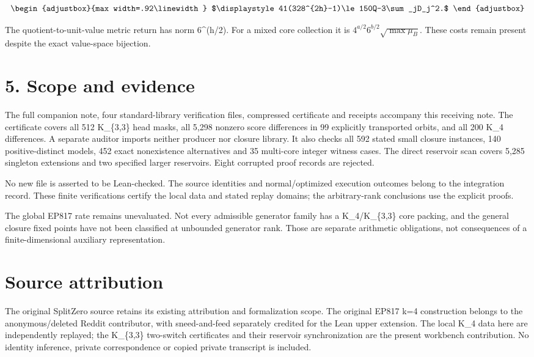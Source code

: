\[
\begin{adjustbox}{max width=.92\linewidth}
$\displaystyle 41(328^{2h}-1)\le150Q-3\sum_jD_j^2.$
\end{adjustbox}
\]

The quotient-to-unit-value metric return has norm 6\^{}(h/2). For a mixed core collection it is \(4^{a/2}6^{b/2}\sqrt{\max\mu_B}\). These costs remain present despite the exact value-space bijection.

\section{5. Scope and evidence}\label{n17-scope-and-evidence}

The full companion note, four standard-library verification files, compressed certificate and receipts accompany this receiving note. The certificate covers all 512 K\_\{3,3\} head masks, all 5,298 nonzero score differences in 99 explicitly transported orbits, and all 200 K\_4 differences. A separate auditor imports neither producer nor closure library. It also checks all 592 stated small closure instances, 140 positive-distinct models, 452 exact nonexistence alternatives and 35 multi-core integer witness cases. The direct reservoir scan covers 5,285 singleton extensions and two specified larger reservoirs. Eight corrupted proof records are rejected.

No new file is asserted to be Lean-checked. The source identities and normal/optimized execution outcomes belong to the integration record. These finite verifications certify the local data and stated replay domains; the arbitrary-rank conclusions use the explicit proofs.

The global EP817 rate remains unevaluated. Not every admissible generator family has a K\_4/K\_\{3,3\} core packing, and the general closure fixed points have not been classified at unbounded generator rank. Those are separate arithmetic obligations, not consequences of a finite-dimensional auxiliary representation.

\section{Source attribution}\label{n17-source-attribution}

The original SplitZero source retains its existing attribution and formalization scope. The original EP817 k=4 construction belongs to the anonymous/deleted Reddit contributor, with sneed-and-feed separately credited for the Lean upper extension. The local K\_4 data here are independently replayed; the K\_\{3,3\} two-switch certificates and their reservoir synchronization are the present workbench contribution. No identity inference, private correspondence or copied private transcript is included.
